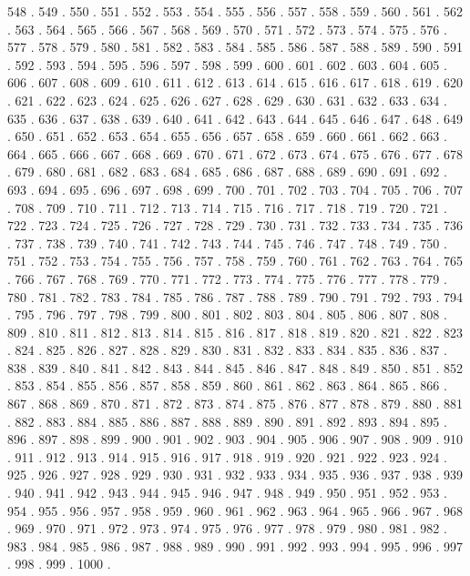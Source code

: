 \documentclass[10pt]{article}
\begin{document}
\begin{Schunk}
\begin{Soutput}
548 . 549 . 550 . 551 . 552 . 553 . 554 . 555 . 556 . 557 . 558 . 559 . 560 . 561 . 562 . 563 . 564 . 565 . 566 . 567 . 568 . 569 . 570 . 571 . 572 . 573 . 574 . 575 . 576 . 577 . 578 . 579 . 580 . 581 . 582 . 583 . 584 . 585 . 586 . 587 . 588 . 589 . 590 . 591 . 592 . 593 . 594 . 595 . 596 . 597 . 598 . 599 . 600 . 601 . 602 . 603 . 604 . 605 . 606 . 607 . 608 . 609 . 610 . 611 . 612 . 613 . 614 . 615 . 616 . 617 . 618 . 619 . 620 . 621 . 622 . 623 . 624 . 625 . 626 . 627 . 628 . 629 . 630 . 631 . 632 . 633 . 634 . 635 . 636 . 637 . 638 . 639 . 640 . 641 . 642 . 643 . 644 . 645 . 646 . 647 . 648 . 649 . 650 . 651 . 652 . 653 . 654 . 655 . 656 . 657 . 658 . 659 . 660 . 661 . 662 . 663 . 664 . 665 . 666 . 667 . 668 . 669 . 670 . 671 . 672 . 673 . 674 . 675 . 676 . 677 . 678 . 679 . 680 . 681 . 682 . 683 . 684 . 685 . 686 . 687 . 688 . 689 . 690 . 691 . 692 . 693 . 694 . 695 . 696 . 697 . 698 . 699 . 700 . 701 . 702 . 703 . 704 . 705 . 706 . 707 . 708 . 709 . 710 . 711 . 712 . 713 . 714 . 715 . 716 . 717 . 718 . 719 . 720 . 721 . 722 . 723 . 724 . 725 . 726 . 727 . 728 . 729 . 730 . 731 . 732 . 733 . 734 . 735 . 736 . 737 . 738 . 739 . 740 . 741 . 742 . 743 . 744 . 745 . 746 . 747 . 748 . 749 . 750 . 751 . 752 . 753 . 754 . 755 . 756 . 757 . 758 . 759 . 760 . 761 . 762 . 763 . 764 . 765 . 766 . 767 . 768 . 769 . 770 . 771 . 772 . 773 . 774 . 775 . 776 . 777 . 778 . 779 . 780 . 781 . 782 . 783 . 784 . 785 . 786 . 787 . 788 . 789 . 790 . 791 . 792 . 793 . 794 . 795 . 796 . 797 . 798 . 799 . 800 . 801 . 802 . 803 . 804 . 805 . 806 . 807 . 808 . 809 . 810 . 811 . 812 . 813 . 814 . 815 . 816 . 817 . 818 . 819 . 820 . 821 . 822 . 823 . 824 . 825 . 826 . 827 . 828 . 829 . 830 . 831 . 832 . 833 . 834 . 835 . 836 . 837 . 838 . 839 . 840 . 841 . 842 . 843 . 844 . 845 . 846 . 847 . 848 . 849 . 850 . 851 . 852 . 853 . 854 . 855 . 856 . 857 . 858 . 859 . 860 . 861 . 862 . 863 . 864 . 865 . 866 . 867 . 868 . 869 . 870 . 871 . 872 . 873 . 874 . 875 . 876 . 877 . 878 . 879 . 880 . 881 . 882 . 883 . 884 . 885 . 886 . 887 . 888 . 889 . 890 . 891 . 892 . 893 . 894 . 895 . 896 . 897 . 898 . 899 . 900 . 901 . 902 . 903 . 904 . 905 . 906 . 907 . 908 . 909 . 910 . 911 . 912 . 913 . 914 . 915 . 916 . 917 . 918 . 919 . 920 . 921 . 922 . 923 . 924 . 925 . 926 . 927 . 928 . 929 . 930 . 931 . 932 . 933 . 934 . 935 . 936 . 937 . 938 . 939 . 940 . 941 . 942 . 943 . 944 . 945 . 946 . 947 . 948 . 949 . 950 . 951 . 952 . 953 . 954 . 955 . 956 . 957 . 958 . 959 . 960 . 961 . 962 . 963 . 964 . 965 . 966 . 967 . 968 . 969 . 970 . 971 . 972 . 973 . 974 . 975 . 976 . 977 . 978 . 979 . 980 . 981 . 982 . 983 . 984 . 985 . 986 . 987 . 988 . 989 . 990 . 991 . 992 . 993 . 994 . 995 . 996 . 997 . 998 . 999 . 1000 . 
\end{Soutput}
\end{Schunk}
 
\end{document}
